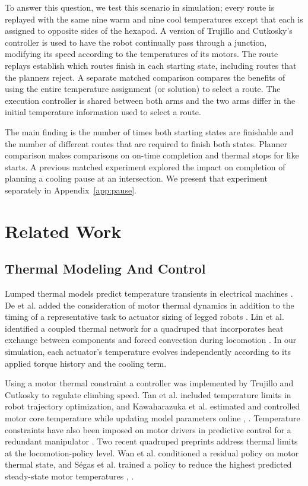 \documentclass{ieeeaccess}
\begin{document}
To answer this question, we test this scenario in simulation; every route is replayed with the same nine warm and nine cool temperatures except that each is assigned to opposite sides of the hexapod. A version of Trujillo and Cutkosky's controller \cite{trujillo2009} is used to have the robot continually pass through a junction, modifying its speed according to the temperatures of its motors. The route replays establish which routes finish in each starting state, including routes that the planners reject. A separate matched comparison compares the benefits of using the entire temperature assignment (or solution) to select a route. The execution controller is shared between both arms and the two arms differ in the initial temperature information used to select a route.

The main finding is the number of times both starting states are finishable and the number of different routes that are required to finish both states. Planner comparison makes comparisons on on-time completion and thermal stops for like starts. A previous matched experiment explored the impact on completion of planning a \textquotedbl{}cooling pause\textquotedbl{} at an intersection. We present that experiment separately in Appendix~\ref{app:pause}.

\section{Related Work}

\subsection{Thermal Modeling And Control}

Lumped thermal models predict temperature transients in electrical machines \cite{mellor1991}. De et al. added the consideration of motor thermal dynamics in addition to the timing of a representative task to actuator sizing of legged robots \cite{de2011}. Lin et al. identified a coupled thermal network for a quadruped that incorporates heat exchange between components and forced convection during locomotion \cite{lin2025}. In our simulation, each actuator's temperature evolves independently according to its applied torque history and the cooling term.

Using a motor thermal constraint \cite{trujillo2009} a controller was implemented by Trujillo and Cutkosky to regulate climbing speed. Tan et al. included temperature limits in robot trajectory optimization, and Kawaharazuka et al. estimated and controlled motor core temperature while updating model parameters online \cite{tan2018heat}, \cite{kawaharazuka2020}. Temperature constraints have also been imposed on motor drivers in predictive control for a redundant manipulator \cite{debenedittis2026}. Two recent quadruped preprints address thermal limits at the locomotion-policy level. Wan et al. conditioned a residual policy on motor thermal state, and Ségas et al. trained a policy to reduce the highest predicted steady-state motor temperatures \cite{wan2026}, \cite{segas2026}.
\end{document}
